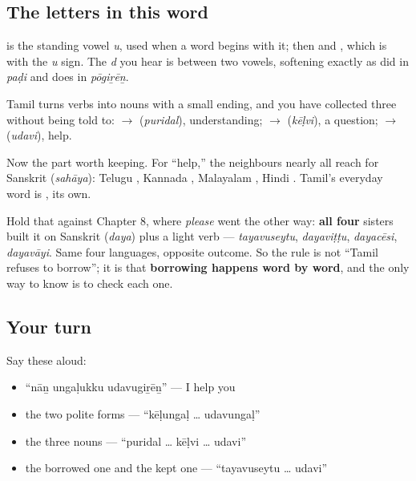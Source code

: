 \subsection*{The letters in this word}
\textbf{} is the standing vowel \emph{u}, used when a word begins with it; then \textbf{} and \textbf{}, which is \textbf{} with the \emph{u} sign. The \emph{d} you hear is \textbf{} between two vowels, softening exactly as \textbf{} did in \emph{paḍi} and \textbf{} does in \emph{pōgiṟēṉ}.

\begin{cousinweb}
Tamil turns verbs into nouns with a small ending, and you have collected three without being told to: \textbf{} $\to$ \textbf{} (\emph{puridal}), understanding; \textbf{} $\to$ \textbf{} (\emph{kēḷvi}), a question; \textbf{} $\to$ \textbf{} (\emph{udavi}), help.

Now the part worth keeping. For \textquotedblleft{}help,\textquotedblright{} the neighbours nearly all reach for Sanskrit \textbf{} (\emph{sahāya}): Telugu \textbf{}, Kannada \textbf{}, Malayalam \textbf{}, Hindi \textbf{}. Tamil's everyday word is \textbf{}, its own.

Hold that against Chapter 8, where \emph{please} went the other way: \textbf{all four} sisters built it on Sanskrit \textbf{} (\emph{daya}) plus a light verb — \emph{tayavuseytu}, \emph{dayaviṭṭu}, \emph{dayacēsi}, \emph{dayavāyi}. Same four languages, opposite outcome. So the rule is not \textquotedblleft{}Tamil refuses to borrow\textquotedblright{}; it is that \textbf{borrowing happens word by word}, and the only way to know is to check each one.
\end{cousinweb}

\subsection*{Your turn}
Say these aloud:

\begin{itemize}
\raggedright
  \item \textquotedblleft{}nāṉ ungaḷukku udavugiṟēṉ\textquotedblright{} — I help you
  \item the two polite forms — \textquotedblleft{}kēḷungaḷ … udavungaḷ\textquotedblright{}
  \item the three nouns — \textquotedblleft{}puridal … kēḷvi … udavi\textquotedblright{}
  \item the borrowed one and the kept one — \textquotedblleft{}tayavuseytu … udavi\textquotedblright{}
\end{itemize}

